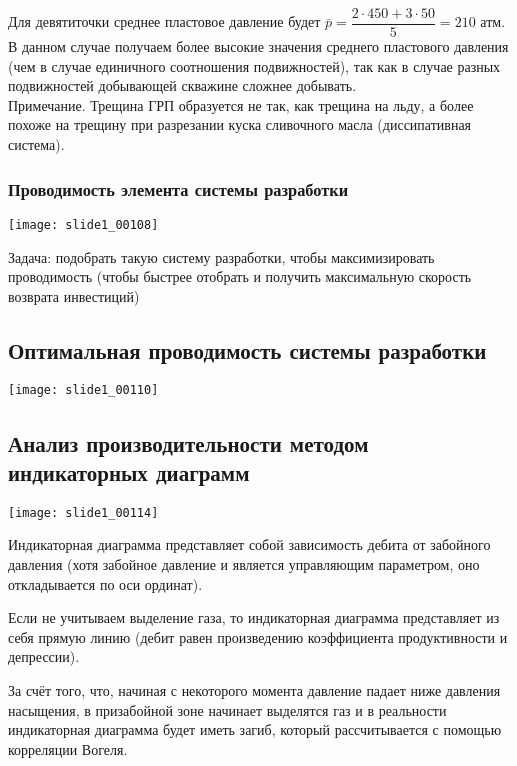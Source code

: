 \documentclass[main.tex]{subfiles}
\begin{document}
Для девятиточки среднее пластовое давление будет $\bar{p}=\dfrac{2\cdot450+3\cdot50}{5}=210$ атм.\\

В данном случае получаем более высокие значения среднего пластового давления (чем в случае единичного соотношения подвижностей), так как в случае разных подвижностей добывающей скважине сложнее добывать.\\

Примечание. Трещина ГРП образуется не так, как трещина на льду, а более похоже на трещину при разрезании куска сливочного масла (диссипативная система).

\subsubsection{Проводимость элемента системы разработки}

\texttt{[image: slide1\_00108]}

Задача: подобрать такую систему разработки, чтобы максимизировать проводимость (чтобы быстрее отобрать и получить максимальную скорость возврата инвестиций)


\subsection{Оптимальная проводимость системы разработки}

\texttt{[image: slide1\_00110]}



\subsection{Анализ производительности методом индикаторных диаграмм}

\texttt{[image: slide1\_00114]}

Индикаторная диаграмма представляет собой зависимость дебита от забойного давления (хотя забойное давление и является управляющим параметром, оно откладывается по оси ординат).

Если не учитываем выделение газа, то индикаторная диаграмма представляет из себя прямую линию (дебит равен произведению коэффициента продуктивности и депрессии).

За счёт того, что, начиная с некоторого момента давление падает ниже давления насыщения, в призабойной зоне начинает выделятся газ и в реальности индикаторная диаграмма будет иметь загиб, который рассчитывается с помощью корреляции Вогеля.
\end{document}
